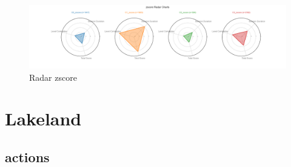 \documentclass{article}
\begin{document}
\begin{figure}[H]
    \centering
    \includegraphics[width=1\columnwidth]{Crystal/progression_logtransform_zNonepca2k4/radar_zscore.png}
    \caption{Radar zscore}
    \label{fig:Crystalprogressionradarzscore}
\end{figure}
\section{Lakeland}

\subsection{actions}
\end{document}
